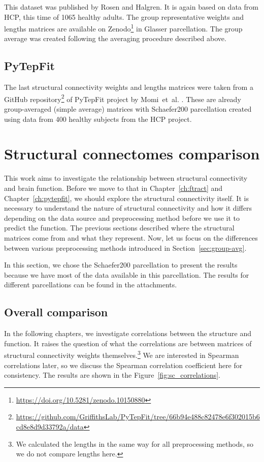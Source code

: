 This dataset was published by Rosen and Halgren. \cite{rosen_whole-cortex_2021} It is again based on data from HCP, this time of 1065 healthy adults. The group representative weights and lengths matrices are available on Zenodo\footnote{\url{https://doi.org/10.5281/zenodo.10150880}} in Glasser parcellation. The group average was created following the averaging procedure described above. 

\subsection{PyTepFit}\label{sec:pytepdata}

The last structural connectivity weights and lengths matrices were taken from a GitHub repository\footnote{\url{https://github.com/GriffithsLab/PyTepFit/tree/66b94e488c82478e6f302015b6cd8e8d9d33792a/data}} of PyTepFit project by Momi~et~al. \cite{momi_tms-evoked_2023}. These are already group-averaged (simple average) matrices with Schaefer200 parcellation created using data from 400 healthy subjects from the HCP project. 

\section{Structural connectomes comparison}

This work aims to investigate the relationship between structural connectivity and brain function. Before we move to that in Chapter~\ref{ch:ftract} and Chapter~\ref{ch:pytepfit}, we should explore the structural connectivity itself. It is necessary to understand the nature of structural connectivity and how it differs depending on the data source and preprocessing method before we use it to predict the function. The previous sections described where the structural matrices come from and what they represent. Now, let us focus on the differences between various preprocessing methods introduced in Section~\ref{sec:group-avg}.

In this section, we chose the Schaefer200 parcellation to present the results because we have most of the data available in this parcellation. The results for different parcellations can be found in the attachments.

\subsection{Overall comparison}

In the following chapters, we investigate correlations between the structure and function. It raises the question of what the correlations are between matrices of structural connectivity weights themselves.\footnote{We calculated the lengths in the same way for all preprocessing methods, so we do not compare lengths here.} We are interested in Spearman correlations later, so we discuss the Spearman correlation coefficient here for consistency. The results are shown in the Figure~\ref{fig:sc_correlations}. 

